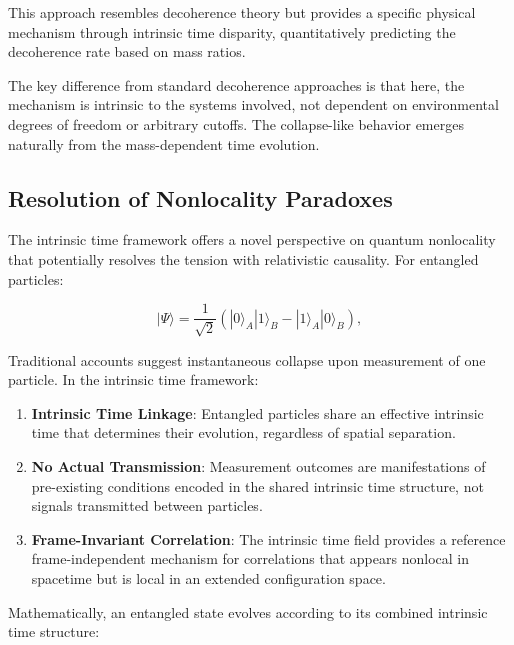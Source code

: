 \documentclass[12pt,a4paper]{article}
\begin{document}
	This approach resembles decoherence theory \cite{Joos1985, Zurek2003} but provides a specific physical mechanism through intrinsic time disparity, quantitatively predicting the decoherence rate based on mass ratios.
	
	The key difference from standard decoherence approaches is that here, the mechanism is intrinsic to the systems involved, not dependent on environmental degrees of freedom or arbitrary cutoffs. The collapse-like behavior emerges naturally from the mass-dependent time evolution.
	
	\subsection{Resolution of Nonlocality Paradoxes}
	\label{subsec:nonlocality_resolution}
	
	The intrinsic time framework offers a novel perspective on quantum nonlocality that potentially resolves the tension with relativistic causality. For entangled particles:
	
	\begin{equation}
		|\Psi\rangle = \frac{1}{\sqrt{2}}(|0\rangle_A |1\rangle_B - |1\rangle_A |0\rangle_B),
		\label{eq:entangled_state_resolution}
	\end{equation}
	
	Traditional accounts suggest instantaneous collapse upon measurement of one particle. In the intrinsic time framework:
	
	\begin{enumerate}
		\item \textbf{Intrinsic Time Linkage}: Entangled particles share an effective intrinsic time that determines their evolution, regardless of spatial separation.
		
		\item \textbf{No Actual Transmission}: Measurement outcomes are manifestations of pre-existing conditions encoded in the shared intrinsic time structure, not signals transmitted between particles.
		
		\item \textbf{Frame-Invariant Correlation}: The intrinsic time field provides a reference frame-independent mechanism for correlations that appears nonlocal in spacetime but is local in an extended configuration space.
	\end{enumerate}
	
	Mathematically, an entangled state evolves according to its combined intrinsic time structure:
	
\end{document}
